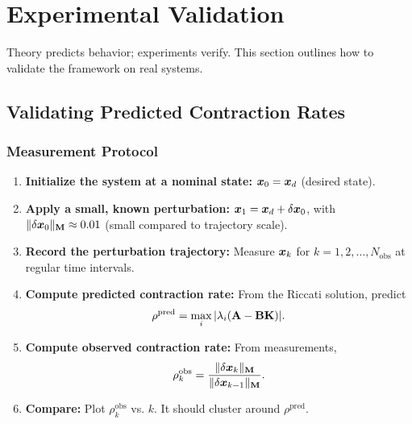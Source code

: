 \section{Experimental Validation}

Theory predicts behavior; experiments verify. This section outlines how to validate
the framework on real systems.

\subsection{Validating Predicted Contraction Rates}

\subsubsection{Measurement Protocol}

\begin{enumerate}
\item \textbf{Initialize the system at a nominal state:} $\bm{x}_0 = \bm{x}_d$ (desired state).

\item \textbf{Apply a small, known perturbation:} $\bm{x}_1 = \bm{x}_d + \delta\bm{x}_0$, with
$\|\delta\bm{x}_0\|_{\mathbf{M}} \approx 0.01$ (small compared to trajectory scale).

\item \textbf{Record the perturbation trajectory:} Measure $\bm{x}_k$ for $k = 1, 2, \ldots, N_{\text{obs}}$
at regular time intervals.

\item \textbf{Compute predicted contraction rate:} From the Riccati solution, predict
\begin{equation}
\rho^{\text{pred}} = \max_i |\lambda_i(\mathbf{A} - \mathbf{B}\mathbf{K})|.
\end{equation}

\item \textbf{Compute observed contraction rate:} From measurements,
\begin{equation}
\rho^{\text{obs}}_k = \frac{\|\delta\bm{x}_k\|_{\mathbf{M}}}{\|\delta\bm{x}_{k-1}\|_{\mathbf{M}}}.
\end{equation}

\item \textbf{Compare:} Plot $\rho^{\text{obs}}_k$ vs. $k$. It should cluster around $\rho^{\text{pred}}$.
\end{enumerate}

